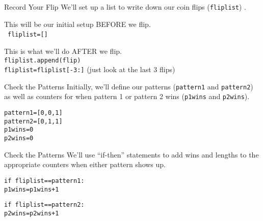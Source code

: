 \documentclass{beamer}
\begin{document}
\begin{frame}{Record Your Flip}
We'll set up a list to write down our coin flips (\texttt{fliplist})
.\\ \pause

\vspace{0.5cm}
This will be our initial setup BEFORE we flip.\\
\
\texttt{fliplist=[]}\\
\pause

\vspace{0.5cm}
This is what we'll do AFTER we flip.\\
\texttt{fliplist.append(flip)}\\
\texttt{fliplist=fliplist[-3:]} (just look at the last 3 flips)
\end{frame}

\begin{frame}{Check the Patterns}
Initially, we'll define our patterns (\texttt{pattern1} and \texttt{pattern2}) as well as counters for when pattern 1 or pattern 2 wins (\texttt{p1wins} and \texttt{p2wins}).


\vspace{0.5cm}\pause

\texttt{pattern1=[0,0,1]} \\
\texttt{pattern2=[0,1,1]}\\
\texttt{p1wins=0}\\
\texttt{p2wins=0}\\

\end{frame}

\begin{frame}{Check the Patterns}
We'll use ``if-then'' statements to add wins and lengths to the appropriate counters when either pattern shows up.\\
\vspace{0.5cm}\pause

\texttt{if fliplist==pattern1:}\\
\hspace{0.5cm}\texttt{p1wins=p1wins+1}\\

\vspace{0.5cm}

\texttt{if fliplist==pattern2:}\\
\hspace{0.5cm}\texttt{p2wins=p2wins+1}\\
\end{frame}
\end{document}
